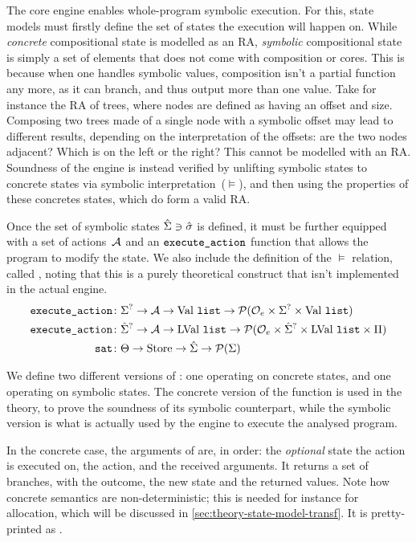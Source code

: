 The core engine enables whole-program symbolic execution. For this, state models must firstly define the set of states the execution will happen on. While \emph{concrete} compositional state is modelled as an RA, \emph{symbolic} compositional state is simply a set of elements that does not come with composition or cores. This is because when one handles symbolic values, composition isn't a partial function any more, as it can branch, and thus output more than one value. Take for instance the RA of trees, where nodes are defined as having an offset and size. Composing two trees made of a single node with a symbolic offset may lead to different results, depending on the interpretation of the offsets: are the two nodes adjacent? Which is on the left or the right? This cannot be modelled with an RA. Soundness of the engine is instead verified by unlifting symbolic states to concrete states via symbolic interpretation~($\models$), and then using the properties of these concretes states, which do form a valid RA.

Once the set of symbolic states $\hat{\Sigma}\ni\hat{\sigma}$ is defined, it must be further equipped with a set of actions~${\cal{A}}$ and an $\texttt{execute\_action}$ function that allows the program to modify the state. We also include the definition of the $\models$ relation, called , noting that this is a purely theoretical construct that isn't implemented in the actual engine.
\begin{align*}
	\texttt{execute\_action} &\colon \Sigma^? \rightarrow {\ensuremath{\cal{A}}} \rightarrow \text{Val}~\texttt{list} \rightarrow {\cal P}({\cal O}_e \times \Sigma^? \times \text{Val}~\texttt{list})\\
	\texttt{execute\_action} &\colon \hat{\Sigma}^? \rightarrow {\ensuremath{\cal{A}}} \rightarrow \text{LVal}~\texttt{list} \rightarrow {\cal P}({\cal O}_e \times \hat{\Sigma}^? \times \text{LVal}~\texttt{list} \times \Pi) \\
	\texttt{sat} &\colon \Theta \rightarrow \text{Store} \rightarrow \hat{\Sigma} \rightarrow {\cal P}(\Sigma)
\end{align*}

We define two different versions of \execac{}: one operating on concrete states, and one operating on symbolic states. The concrete version of the function is used in the theory, to prove the soundness of its symbolic counterpart, while the symbolic version is what is actually used by the engine to execute the analysed program.

In the concrete case, the arguments of \execac{} are, in order: the \emph{optional} state the action is executed on, the action, and the received arguments. It returns a set of branches, with the outcome, the new state and the returned values. Note how concrete semantics are non-deterministic; this is needed for instance for allocation, which will be discussed in \cref{sec:theory-state-model-transf}. It is pretty-printed as .

